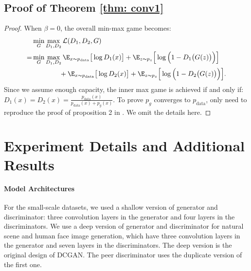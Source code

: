 \subsection{Proof of Theorem \ref{thm: conv1}}
\begin{proof}
When $\beta=0$, the overall min-max game becomes:
\begin{align}
    &\min_{G}\max_{D_1,D_2}\mathcal{L}(D_1,D_2, G)\notag\\
    =& \min_{G} \max_{D_1,D_2} \E_{x\thicksim p_{\text{data}}}\big[\log D_1(x)\big]+\E_{z\thicksim p_{z}}\Big[\log \Big(1-D_1\big(G(z)\big)\Big)\Big]\notag\\
    &\qquad \qquad +\E_{x\thicksim p_{\text{data}}}\big[\log D_2(x)\big]+\E_{z\thicksim p_{z}}\Big[\log \Big(1-D_2\big(G(z)\big)\Big)\Big].
\end{align}
Since we assume enough capacity, the inner max game is achieved if and only if:
$D_1(x)=D_2(x)=\frac{p_{\text{data}}(x)}{p_{\text{data}}(x)+p_g(x)}$. To prove $p_g$ converges to $p_{\text{data}}$, only need to reproduce the proof of proposition 2 in \cite{gan}. We omit the details here.

\end{proof}




\section{Experiment Details and Additional Results}\label{app:exp}
\paragraph{Model Architectures}

For the small-scale datasets, we used a shallow version of generator and discriminator: three convolution layers in the generator and four layers in the discriminators. We use a deep version of generator and discriminator for natural scene and human face image generation, which have three convolution layers in the generator and seven layers in the discriminators. The deep version is the original design of DCGAN\cite{DCGAN}. The peer discriminator uses the duplicate version of the first one. 

